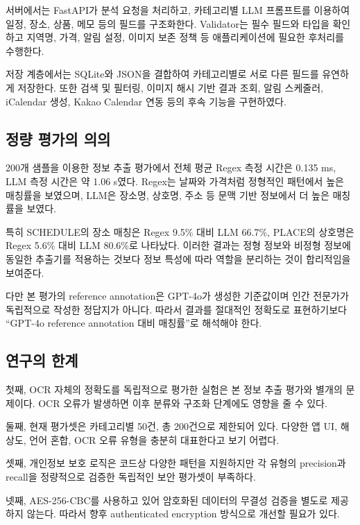\documentclass[11pt,a4paper]{article}
\begin{document}
서버에서는 FastAPI가 분석 요청을 처리하고, 카테고리별 LLM 프롬프트를 이용하여 일정, 장소, 상품, 메모 등의 필드를 구조화한다. Validator는 필수 필드와 타입을 확인하고 지역명, 가격, 알림 설정, 이미지 보존 정책 등 애플리케이션에 필요한 후처리를 수행한다.

저장 계층에서는 SQLite와 JSON을 결합하여 카테고리별로 서로 다른 필드를 유연하게 저장한다. 또한 검색 및 필터링, 이미지 해시 기반 결과 조회, 알림 스케줄러, iCalendar 생성, Kakao Calendar 연동 등의 후속 기능을 구현하였다.

\subsection{정량 평가의 의의}

200개 샘플을 이용한 정보 추출 평가에서 전체 평균 Regex 측정 시간은 0.135 ms, LLM 측정 시간은 약 1.06 s였다. Regex는 날짜와 가격처럼 정형적인 패턴에서 높은 매칭률을 보였으며, LLM은 장소명, 상호명, 주소 등 문맥 기반 정보에서 더 높은 매칭률을 보였다.

특히 SCHEDULE의 장소 매칭은 Regex 9.5\% 대비 LLM 66.7\%, PLACE의 상호명은 Regex 5.6\% 대비 LLM 80.6\%로 나타났다. 이러한 결과는 정형 정보와 비정형 정보에 동일한 추출기를 적용하는 것보다 정보 특성에 따라 역할을 분리하는 것이 합리적임을 보여준다.

다만 본 평가의 reference annotation은 GPT-4o가 생성한 기준값이며 인간 전문가가 독립적으로 작성한 정답지가 아니다. 따라서 결과를 절대적인 정확도로 표현하기보다 ``GPT-4o reference annotation 대비 매칭률''로 해석해야 한다.

\subsection{연구의 한계}

첫째, OCR 자체의 정확도를 독립적으로 평가한 실험은 본 정보 추출 평가와 별개의 문제이다. OCR 오류가 발생하면 이후 분류와 구조화 단계에도 영향을 줄 수 있다.

둘째, 현재 평가셋은 카테고리별 50건, 총 200건으로 제한되어 있다. 다양한 앱 UI, 해상도, 언어 혼합, OCR 오류 유형을 충분히 대표한다고 보기 어렵다.

셋째, 개인정보 보호 로직은 코드상 다양한 패턴을 지원하지만 각 유형의 precision과 recall을 정량적으로 검증한 독립적인 보안 평가셋이 부족하다.

넷째, AES-256-CBC를 사용하고 있어 암호화된 데이터의 무결성 검증을 별도로 제공하지 않는다. 따라서 향후 authenticated encryption 방식으로 개선할 필요가 있다.
\end{document}
